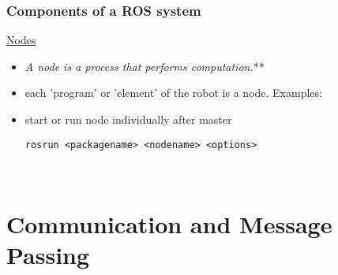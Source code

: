 \documentclass[fleqn]{beamer} %
\newcommand{\sectiontitleI}{Components of a ROS system} %
\newcommand{\sectiontitleII}{Communication and Message Passing}
\begin{document}
	\begin{frame}[containsverbatim] \small
		\frametitle{\sectiontitleI}
\href{http://wiki.ros.org/Nodes}{Nodes}             
                \begin{itemize}
                    \item {\it A node is a process that performs computation.}** 
                    \item each 'program' or 'element' of the robot is a node. Examples:
                        \begin{itemize} 
                        \end{itemize}
                    \item start or run node individually after master\vspace{5mm}\\
                    \begin{verbatim}
rosrun <packagename> <nodename> <options> 
                    \end{verbatim} 
                    \vspace{1mm}\\
                  
                                      
                \end{itemize}
	\end{frame}

\section{\sectiontitleII}
\end{document}
